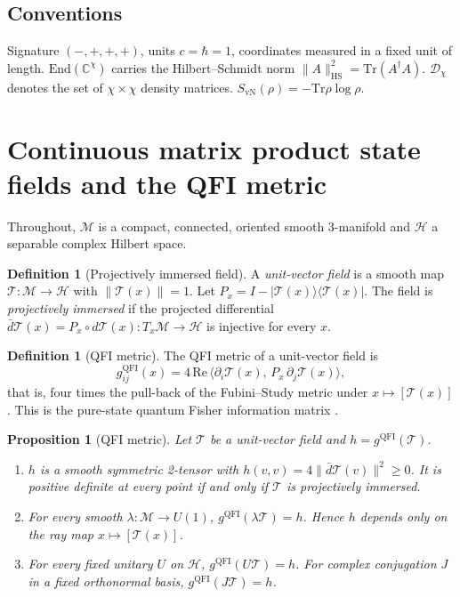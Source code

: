 \documentclass[11pt,a4paper,reqno]{amsart}
\newtheorem{proposition}[theorem]{Proposition}
\theoremstyle{definition}
\newtheorem{definition}[theorem]{Definition}
\numberwithin{equation}{section}
\newcommand{\C}{\mathbb{C}}
\newcommand{\Tr}{\mathrm{Tr}}
\newcommand{\End}{\mathrm{End}}
\newcommand{\QFI}{\mathrm{QFI}}
\newcommand{\HS}{\mathrm{HS}}
\newcommand{\Dens}{\mathcal{D}_\chi}
\begin{document}
\subsection*{Conventions}
Signature $(-,+,+,+)$, units $c=\hbar=1$, coordinates measured in a fixed unit of length. $\End(\C^\chi)$ carries the Hilbert--Schmidt norm $\|A\|_{\HS}^2=\Tr(A^\dagger A)$. $\Dens$ denotes the set of $\chi\times\chi$ density matrices. $S_{\mathrm{vN}}(\rho)=-\Tr\rho\log\rho$.

\section{Continuous matrix product state fields and the QFI metric}
\label{sec:qfi}

Throughout, $\mathcal{M}$ is a compact, connected, oriented smooth 3-manifold and $\mathcal{H}$ a separable complex Hilbert space.

\begin{definition}[Projectively immersed field]\label{def:field}
A \emph{unit-vector field} is a smooth map $\mathcal{T}:\mathcal{M}\to\mathcal{H}$ with $\|\mathcal{T}(x)\|=1$. Let $P_x=I-|\mathcal{T}(x)\rangle\langle\mathcal{T}(x)|$. The field is \emph{projectively immersed} if the projected differential $\bar d\mathcal{T}(x)=P_x\circ d\mathcal{T}(x):T_x\mathcal{M}\to\mathcal{H}$ is injective for every $x$.
\end{definition}

\begin{definition}[QFI metric]
The QFI metric of a unit-vector field is
\begin{equation}\label{eq:qfi}
    g^{\QFI}_{ij}(x)=4\,\mathrm{Re}\,\big\langle \partial_i\mathcal{T}(x),\,P_x\,\partial_j\mathcal{T}(x)\big\rangle,
\end{equation}
that is, four times the pull-back of the Fubini--Study metric under $x\mapsto[\mathcal{T}(x)]$. This is the pure-state quantum Fisher information matrix \cite[Thm.~2.5, Eqs.~(25) and~(74)]{liu2020qfi}.
\end{definition}

\begin{proposition}[QFI metric]\label{prop:qfi}
Let $\mathcal{T}$ be a unit-vector field and $h=g^{\QFI}(\mathcal{T})$.
\begin{enumerate}[label=(\alph*)]
    \item $h$ is a smooth symmetric 2-tensor with $h(v,v)=4\|\bar d\mathcal{T}(v)\|^2\ge 0$. It is positive definite at every point if and only if $\mathcal{T}$ is projectively immersed.
    \item For every smooth $\lambda:\mathcal{M}\to U(1)$, $g^{\QFI}(\lambda\mathcal{T})=h$. Hence $h$ depends only on the ray map $x\mapsto[\mathcal{T}(x)]$.
    \item For every fixed unitary $U$ on $\mathcal{H}$, $g^{\QFI}(U\mathcal{T})=h$. For complex conjugation $J$ in a fixed orthonormal basis, $g^{\QFI}(J\mathcal{T})=h$.
\end{enumerate}
\end{proposition}
\end{document}
